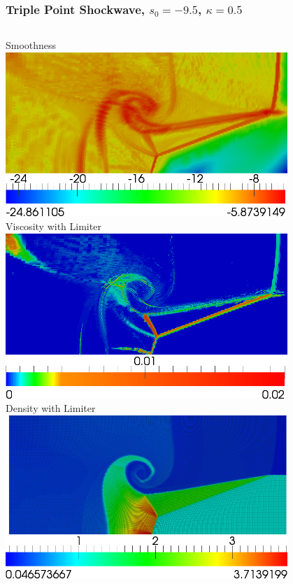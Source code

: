 \documentclass[8pt,xcolor=svgnames]{beamer}
\begin{document}
\begin{frame}\frametitle{Triple Point Shockwave, $s_0=-9.5$, $\kappa=0.5$}
\vspace{1ex}
\vspace{-4ex}
\small{
\begin{columns}
\begin{column}{0.45\textwidth}
\begin{center}
Smoothness\\
\includegraphics[width=0.8\textwidth]{figs/TriplePt/Q2-4-smoothness-limiter.png}\\
Viscosity with Limiter\\
\includegraphics[width=0.8\textwidth]{figs/TriplePt/Q2-4-viscosity-limiter.png}\\
Density with Limiter\\
\includegraphics[width=0.8\textwidth]{figs/TriplePt/Q2-4-density-limiter.png}\\

\end{center}
\end{column}
\end{columns}}
\end{frame}
\end{document}
